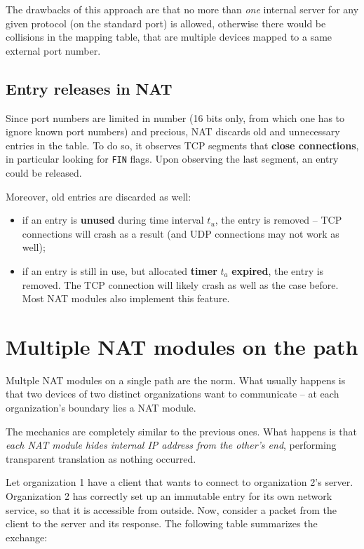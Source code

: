 \documentclass[10pt]{extbook}
\begin{document}
The drawbacks of this approach are that no more than \emph{one} internal server
for any given protocol (on the standard port) is allowed, otherwise there would
be collisions in the mapping table, that are multiple devices mapped to a same
external port number.

\subsection{Entry releases in NAT}

Since port numbers are limited in number (16 bits only, from which one has to
ignore known port numbers) and precious, NAT discards old and unnecessary
entries in the table. To do so, it observes TCP segments that \textbf{close
connections}, in particular looking for \texttt{FIN} flags. Upon observing the last segment, an entry could be released. 

Moreover, old entries are discarded as well:
\begin{itemize}
    \item if an entry is \textbf{unused} during time interval $t_{u}$, the
        entry is removed -- TCP connections will crash as a result (and UDP
        connections may not work as well);
    \item if an entry is still in use, but allocated \textbf{timer} $t_{a}$
        \textbf{expired}, the entry is removed. The TCP connection will likely
        crash as well as the case before. Most NAT modules also implement this
        feature.
\end{itemize}

\section{Multiple NAT modules on the path}

Multple NAT modules on a single path are the norm. What usually happens is that two devices of two distinct organizations want to communicate -- at each organization's boundary lies a NAT module. 

The mechanics are completely similar to the previous ones. What happens is that
\emph{each NAT module hides internal IP address from the other's end},
performing transparent translation as nothing occurred.

Let organization 1 have a client that wants to connect to organization 2's
server. Organization 2 has correctly set up an immutable entry for its own network
service, so that it is accessible from outside. Now, consider a packet from the
client to the server and its response. The following table summarizes the
exchange:
\end{document}
